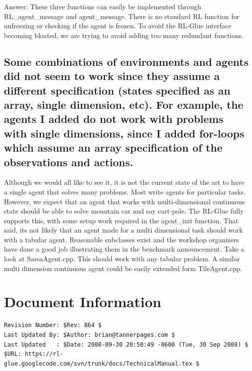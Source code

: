 \documentclass[11pt]{article}
\begin{document}
Answer: These three functions can easily be implemented through RL\_agent\_message and agent\_message. There is no standard RL function for unfreezing or checking if the agent is frozen. To avoid the RL-Glue interface becoming bloated, we are trying to avoid adding too many redundant functions.


\subsection{Some combinations of environments and agents did not seem to work since they assume a different specification (states specified as an array, single dimension, etc). For example, the agents I added do not work with problems with single dimensions, since I added for-loops which assume an array specification of the observations and actions.}

Although we would all like to see it, it is not the current state of the art to have a single agent that solves many problems. Most write agents for particular tasks. However, we expect that an agent that works with multi-dimensional continuous state should be able to solve mountain car and say cart-pole. The RL-Glue fully supports this, with some setup work required in the agent\_init function. That said, its not likely that an agent made for a multi dimensional task should work with a tabular agent. Reasonable subclasses exist and the workshop organizers have done a good job illustrating them in the benchmark announcement. Take a look at SarsaAgent.cpp. This should work with any tabular problem. A similar multi dimension continuous agent could be easily extended form TileAgent.cpp.




\section*{Document Information}
\begin{verbatim}
Revision Number: $Rev: 864 $
Last Updated By: $Author: brian@tannerpages.com $
Last Updated   : $Date: 2008-09-30 20:50:49 -0600 (Tue, 30 Sep 2008) $
$URL: https://rl-glue.googlecode.com/svn/trunk/docs/TechnicalManual.tex $
\end{verbatim}
\end{document}
